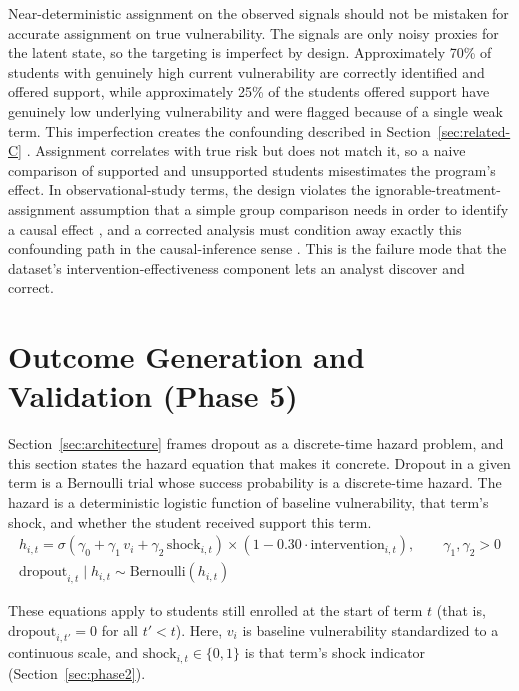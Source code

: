 \documentclass[11pt]{article}
\begin{document}
Near-deterministic assignment on the observed signals should not be mistaken for accurate assignment on true vulnerability. The signals are only noisy proxies for the latent state, so the targeting is imperfect by design. Approximately 70\% of students with genuinely high current vulnerability are correctly identified and offered support, while approximately 25\% of the students offered support have genuinely low underlying vulnerability and were flagged because of a single weak term. This imperfection creates the confounding described in Section~\ref{sec:related-C} \citep{smith2021}. Assignment correlates with true risk but does not match it, so a naive comparison of supported and unsupported students misestimates the program's effect. In observational-study terms, the design violates the ignorable-treatment-assignment assumption that a simple group comparison needs in order to identify a causal effect \citep{gelman2020ros}, and a corrected analysis must condition away exactly this confounding path in the causal-inference sense \citep{peters2017}. This is the failure mode that the dataset's intervention-effectiveness component lets an analyst discover and correct.

\FloatBarrier
\section{Outcome Generation and Validation (Phase 5)}
\label{sec:phase5}

\hspace*{\parindent}Section~\ref{sec:architecture} frames dropout as a discrete-time hazard problem, and this section states the hazard equation that makes it concrete. Dropout in a given term is a Bernoulli trial whose success probability is a discrete-time hazard. The hazard is a deterministic logistic function of baseline vulnerability, that term's shock, and whether the student received support this term.
\begin{gather}
h_{i,t} = \sigma\!\left(\gamma_0 + \gamma_1\, v_i + \gamma_2\, \text{shock}_{i,t}\right) \times \left(1 - 0.30 \cdot \text{intervention}_{i,t}\right), \qquad \gamma_1, \gamma_2 > 0 \label{eq:hazard}\\[8pt]
\text{dropout}_{i,t} \mid h_{i,t} \sim \text{Bernoulli}(h_{i,t}) \label{eq:dropout}
\end{gather}

These equations apply to students still enrolled at the start of term $t$ (that is, $\text{dropout}_{i,t'}=0$ for all $t'<t$). Here, $v_i$ is baseline vulnerability standardized to a continuous scale, and $\text{shock}_{i,t}\in\{0,1\}$ is that term's shock indicator (Section~\ref{sec:phase2}).
\end{document}
